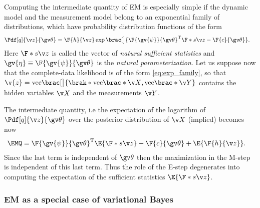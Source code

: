 Computing the intermediate quantity of EM is especially simple
if the dynamic model and the measurement model belong to an exponential
family of distributions, which have probability distribution functions of the form 
\begin{align}
	\Pdf[q]{\z}{\Th}&=\F{h}{\z}\exp\brac[\big]{ \F{\gv{\psi}}{\Th}^\tr \F*{s}{\z}-\F{c}{\Th}}.
	\label{eq:exp_family}
\end{align}
Here $\F*{s}{\z}$ is called the vector of \emph{natural sufficient statistics} and
$\gv{\eta}\equiv \F{\gv{\psi}}{\Th}$ is the \emph{natural parameterization}.
Let us suppose now that the complete-data likelihood is of the form \eqref{eq:exp_family}, so
that $\v{z}=\mathrm{vec}\brac[\big]{\brak*{\mathrm{vec}\brac*{\X},\mathrm{vec}\brac*{\Y}}}$ contains the
hidden variables $\X$ and the measurements $\Y$. 

The intermediate quantity, i.e the expectation of the logarithm of $\Pdf[q]{\z}{\Th}$ over the posterior distribution of 
$\X$ (implied) becomes now
\begin{align}
	\EMQ&=	\F{\gv{\psi}}{\Th}^\tr \E{\F*{s}{\z}}-\F{c}{\Th}+\E{\F{h}{\z}}.
\end{align}
Since the last term is independent of $\Th$ then the maximization in the M-step
is independent of this last term. Thus the role of the E-step degenerates into computing the
expectation of the sufficient statistics $\E{\F*{s}{\z}}$.


\subsubsection{EM as a special case of variational Bayes}

